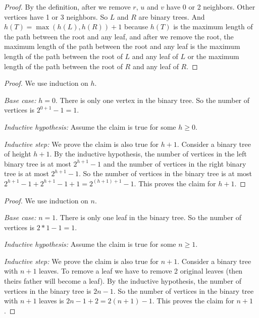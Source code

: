 \documentclass[11pt]{article}
\begin{document}
\begin{solution}
\begin{Parts}
    \Part 
    \begin{proof}
        By the definition, after we remove $r$, $u$ and $v$ have 0 or 2 neighbors. Other vertices have 1 or 3 neighbors. So $L$ and $R$ are binary trees. And $h(T) = \max(h(L),h(R)) + 1$ because $h(T)$ is the maximum length of the path between the root and any leaf, and after we remove the root, the maximum length of the path between the root and any leaf is the maximum length of the path between the root of $L$ and any leaf of $L$ or the maximum length of the path between the root of $R$ and any leaf of $R$.
    \end{proof}
    \Part 
    \begin{proof}
        We use induction on $h$.
        
        \emph{Base case:} $h = 0$. There is only one vertex in the binary tree. So the number of vertices is $2^{0+1}-1 = 1$.
        
        \emph{Inductive hypothesis:} Assume the claim is true for some $h \ge 0$.
        
        \emph{Inductive step:} We prove the claim is also true for $h+1$. Consider a binary tree of height $h+1$. By the inductive hypothesis, the number of vertices in the left binary tree is at most $2^{h+1}-1$ and the number of vertices in the right binary tree is at most $2^{h+1}-1$. So the number of vertices in the binary tree is at most $2^{h+1}-1 + 2^{h+1}-1 + 1 = 2^{(h+1)+1}-1$. This proves the claim for $h+1$.
    \end{proof}
    \Part
    \begin{proof}
        We use induction on $n$.
        
        \emph{Base case:} $n = 1$. There is only one leaf in the binary tree. So the number of vertices is $2*1-1 = 1$.
        
        \emph{Inductive hypothesis:} Assume the claim is true for some $n \ge 1$.
        
        \emph{Inductive step:} We prove the claim is also true for $n+1$. Consider a binary tree with $n+1$ leaves. To remove a leaf we have to remove 2 original leaves (then theirs father will become a leaf). 
        By the inductive hypothesis, the number of vertices in the binary tree is $2n-1$. So the number of vertices in the binary tree with $n+1$ leaves is $2n-1 + 2 = 2(n+1)-1$. This proves the claim for $n+1$.
    \end{proof}
\end{Parts}
\end{solution}
\end{document}
